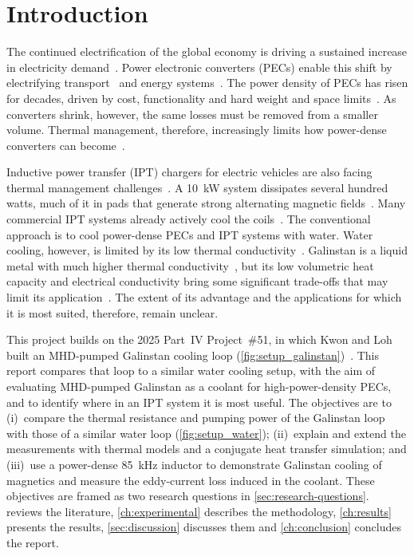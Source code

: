 \chapter{Introduction}
\label{ch:Introduction}

The continued electrification of the global economy is driving a sustained
increase in electricity demand~\cite{international_energy_agency_electricity_2025}.
Power electronic converters (PECs) enable this shift by electrifying
transport~\cite{bosshard_multi-objective_2016} and energy
systems~\cite{steimer_enabled_2010}. The power density of PECs has risen for decades,
driven by cost, functionality and hard weight and space
limits~\cite{steimer_enabled_2010,biela_cooling_2007, morroni_understanding_2023}. As converters shrink, however, the
same losses must be removed from a smaller volume. Thermal management, therefore,
increasingly limits how power-dense converters can become~\cite{biela_cooling_2007,morroni_understanding_2023}.

Inductive power transfer (IPT) chargers for electric vehicles are also facing thermal management challenges~\cite{liu_thermal_2025}. 
A \SI{10}{\kilo\watt} system dissipates several hundred watts, much of it in pads
that generate strong alternating magnetic fields~\cite{kim_thermal_2022}. Many
commercial IPT systems already actively cool the coils~\cite{lawton_power_2024}.
The conventional approach is to cool power-dense PECs and IPT systems with water.
Water cooling, however, is limited by its low thermal conductivity~\cite{laloya_heat_2016}. 
Galinstan is a liquid metal with much higher thermal conductivity~\cite{noauthor_gainsn_nodate, hodes_potential_2014},
but its low volumetric heat capacity and electrical conductivity bring some significant trade-offs that may limit its application~\cite{hodes_potential_2014,an_liquid_2024}.
The extent of its advantage and the applications for which it is most suited, therefore, remain unclear.

This project builds on the 2025 Part~IV Project~\#51, in which Kwon and Loh
built an MHD-pumped Galinstan cooling loop (\cref{fig:setup_galinstan})~\cite{kwon_project_2025,loh_project_2025}. 
This report compares that loop to a similar water cooling setup, with the aim of 
evaluating MHD-pumped Galinstan as a coolant for high-power-density PECs, and to identify
where in an IPT system it is most useful. The objectives are to (i)~compare the
thermal resistance and pumping power of the Galinstan loop with those of a similar water
loop (\cref{fig:setup_water}); (ii)~explain and
extend the measurements with thermal models and a conjugate heat transfer
simulation; and (iii)~use a power-dense \SI{85}{\kilo\hertz} inductor to
demonstrate Galinstan cooling of magnetics and measure the eddy-current loss
induced in the coolant. These objectives are framed as two research questions
in \cref{sec:research-questions}.  reviews the literature,
\cref{ch:experimental} describes the methodology, \cref{ch:results} presents
the results, \cref{sec:discussion} discusses them and \cref{ch:conclusion}
concludes the report.

